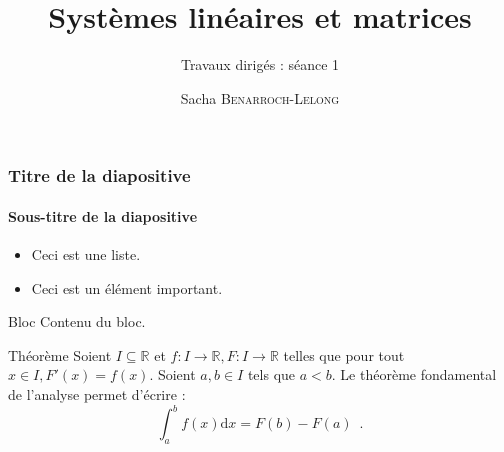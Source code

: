 \documentclass[french]{bmagi}
\title{Systèmes linéaires et matrices}
\subtitle{Travaux dirigés : séance 1}
\author{Sacha \textsc{Benarroch-Lelong}}
\begin{document}
\begin{frame}
	\titlepage
\end{frame}

\begin{frame}
	\frametitle{Titre de la diapositive}
	\framesubtitle{Sous-titre de la diapositive}
	\begin{itemize}
		\item Ceci est une liste.
		\item Ceci est un élément \alert{important}.
	\end{itemize}
	\begin{block}{Bloc}
		Contenu du bloc.
	\end{block}
	\begin{alertblock}{Théorème}
		Soient $I\subseteq\mathbb{R}$ et $f:I\to\mathbb{R}, F:I\to\mathbb{R}$ telles que pour tout $x\in I, F'(x)=f(x)$. Soient $a,b\in I$ tels que $a<b$. Le théorème fondamental de l'analyse permet d'écrire :
		\[
			\int_a^bf(x)\mathrm{d}x=F(b)-F(a)\enspace.
		\]
	\end{alertblock}
\end{frame}
\end{document}
